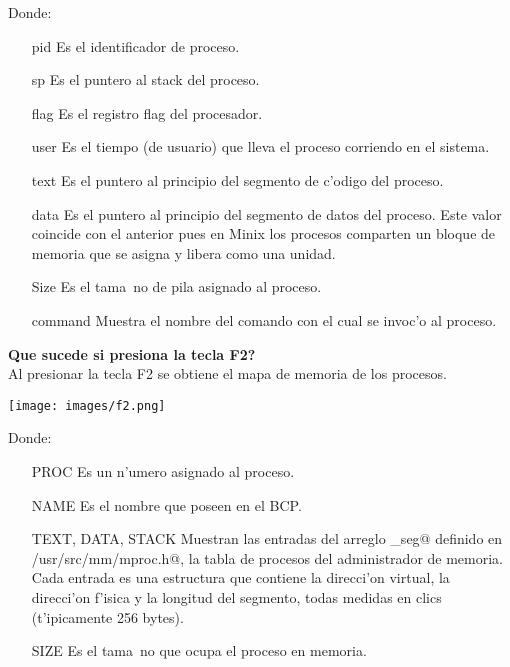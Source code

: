 \begin{itemize}
		Donde:

		\begin{itemize}
			\item[pid] Es el identificador de proceso.
			\item[sp] Es el puntero al stack del proceso.
			\item[flag] Es el registro flag del procesador.
			\item[user] Es el tiempo (de usuario) que lleva el proceso corriendo en el sistema.
			\item[text] Es el puntero al principio del segmento de c'odigo del proceso.
			\item[data] Es el puntero al principio del segmento de datos del proceso. Este valor coincide con el anterior pues en Minix los procesos comparten un bloque de memoria que se asigna y libera como una unidad.
			\item[Size] Es el tama~no de pila asignado al proceso.
			\item[command] Muestra el nombre del comando con el cual se invoc'o al proceso.
		\end{itemize}
		\textbf{Que sucede si presiona la tecla F2?}\\
		Al presionar la tecla F2 se obtiene el mapa de memoria de los procesos. 
		\begin{center}
			\texttt{[image: images/f2.png]}
		\end{center}
		Donde:

		\begin{itemize}
			\item[PROC] Es un n'umero asignado al proceso.
			\item[NAME] Es el nombre que poseen en el BCP.
			\item[TEXT, DATA, STACK] Muestran las entradas del arreglo \verb@mp_seg@ definido en \verb@/usr/src/mm/mproc.h@, la tabla de procesos del administrador de memoria. Cada entrada es una estructura que contiene la direcci'on virtual, la direcci'on f'isica y la longitud del segmento, todas medidas en clics (t'ipicamente 256 bytes).
			\item[SIZE] Es el tama~no que ocupa el proceso en memoria.
		\end{itemize}
	\end{itemize}
